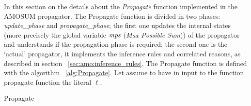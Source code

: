 In this section on the details about the \textit{Propagate} function implemented in the AMOSUM 
propagator.
The Propagate function is divided in two phases: \textit{update\_phase} and \textit{propagate\_phase};
the first one updates the internal states (more precisely the global variable $\mathit{mps}$ (\textit{Max Possible Sum}))
of the propagator and understands if the propagation phase is 
required; the second one is the `actual' propagator, it implements the inference rules and 
correlated reasons, as described in section ~\ref{sec:amo:inference_rules}.
The Propagate function is defined with the algorithm ~\ref{alg:Propagate}.
Let assume to have in input to the function propagate function the literal $\ell$.
\begin{algorithm}[H]\small
    \caption{Propagate}
    \label{alg:Propagate}
\end{algorithm}

